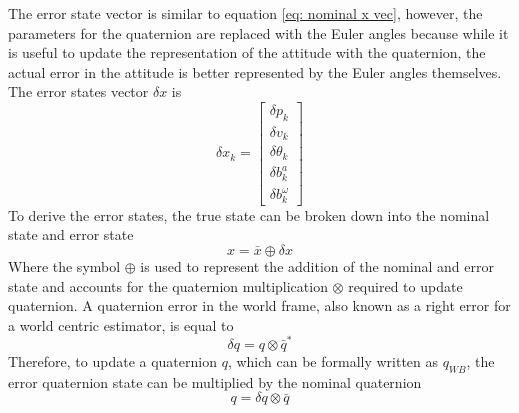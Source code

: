 The error state vector is similar to equation \eqref{eq: nominal x vec}, however, the parameters for the quaternion are replaced with the Euler angles because while it is useful to update the representation of the attitude with the quaternion, the actual error in the attitude is better represented by the Euler angles themselves. The error states vector $\delta x$ is
\begin{equation}
    \delta x_k = \begin{bmatrix}
            \delta p_k \\
             \delta v_k \\
            \delta \theta_k \\
            \delta b^a_k \\
            \delta b^{\omega}_k
        \end{bmatrix} 
    \label{eq: error x vec}
\end{equation}
To derive the error states, the true state can be broken down into the nominal state and error state
\begin{equation}
    x = \bar{x} \oplus \delta x
    \label{eq:true = nominal + error}
\end{equation}
Where the symbol $\oplus$ is used to represent the addition of the nominal and error state and accounts for the quaternion multiplication $\otimes$ required to update quaternion. A quaternion error in the world frame, also known as a right error for a world centric estimator, is equal to \cite{Quaternion_Kinematics_for_the_Error-state_EKF}
\begin{equation}
    \delta q = q \otimes \bar{q}^*
    \label{eq: q right error}
\end{equation}
Therefore, to update a quaternion $q$, which can be formally written as $q_{WB}$, the error quaternion state can be multiplied by the nominal quaternion
\begin{equation}
    q = \delta q \otimes \bar{q}
    \label{eq: q right update}
\end{equation}

